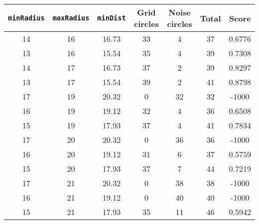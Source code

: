 \documentclass[letterpaper, 12pt]{article}
\begin{document}
\begin{longtable}{|c|c|c|c|c|c|c|}
\hline
\textbf{\texttt{minRadius}} & \textbf{\texttt{maxRadius}} & \textbf{\texttt{minDist}} & \textbf{Grid circles} & \textbf{Noise circles} & \textbf{Total} & \textbf{Score} \\
\hline
14 & 16 & 16.73 & 33 & 4 & 37 & 0.6776 \\
\hline
13 & 16 & 15.54 & 35 & 4 & 39 & 0.7308 \\
\hline
14 & 17 & 16.73 & 37 & 2 & 39 & 0.8297 \\
\hline
13 & 17 & 15.54 & 39 & 2 & 41 & 0.8798 \\
\hline
17 & 19 & 20.32 & 0 & 32 & 32 & -1000 \\
\hline
16 & 19 & 19.12 & 32 & 4 & 36 & 0.6508 \\
\hline
15 & 19 & 17.93 & 37 & 4 & 41 & 0.7834 \\
\hline
17 & 20 & 20.32 & 0 & 36 & 36 & -1000 \\
\hline
16 & 20 & 19.12 & 31 & 6 & 37 & 0.5759 \\
\hline
15 & 20 & 17.93 & 37 & 7 & 44 & 0.7219 \\
\hline
17 & 21 & 20.32 & 0 & 38 & 38 & -1000 \\
\hline
16 & 21 & 19.12 & 0 & 40 & 40 & -1000 \\
\hline
15 & 21 & 17.93 & 35 & 11 & 46 & 0.5942 \\
\hline
\end{longtable}
\end{document}
